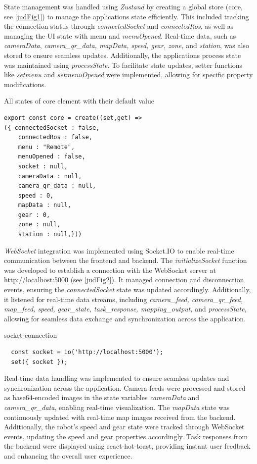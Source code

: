 \documentclass[../../main]{subfiles}
\begin{document}
State management was handled using \emph{Zustand} by creating a global
store (core, see \cref{judFig1}) to manage the application\textquotesingle s
state efficiently. This included tracking the connection status through
\emph{connectedSocket} and \emph{connectedRos}, as well as managing the
UI state with menu and \emph{menuOpened}. Real-time data, such as
\emph{cameraData}, \emph{camera\_qr\_data, mapData, speed, gear, zone,}
and \emph{station}, was also stored to ensure seamless updates.
Additionally, the application\textquotesingle s process state was
maintained using \emph{processState}. To facilitate state updates,
setter functions like \emph{setmenu} and \emph{setmenuOpened} were
implemented, allowing for specific property modifications.
\begin{codebox}[]{All states of core element with their default value}
\begin{verbatim}
export const core = create((set,get) => 
({ connectedSocket : false,
    connectedRos : false,
    menu : "Remote",
    menuOpened : false,
    socket : null,
    cameraData : null,
    camera_qr_data : null,
    speed : 0,
    mapData : null,
    gear : 0,
    zone : null,
    station : null,}))

\end{verbatim}
\end{codebox}
\emph{WebSocket} integration was implemented using Socket.IO to enable
real-time communication between the frontend and backend. The
\emph{initializeSocket} function was developed to establish a connection
with the WebSocket server at \url{http://localhost:5000} (see \cref{judFig2}).
It managed connection and disconnection events, ensuring the
\emph{connectedSocket} state was updated accordingly. Additionally, it
listened for real-time data streams, including \emph{camera\_feed,
camera\_qr\_feed, map\_feed, speed, gear\_state, task\_response,
mapping\_output,} and \emph{processState}, allowing for seamless data
exchange and synchronization across the application.
\begin{codebox}[]{socket connection}
  \begin{verbatim}
  const socket = io('http://localhost:5000');
  set({ socket });
\end{verbatim}
\end{codebox}


Real-time data handling was implemented to ensure seamless updates and
synchronization across the application. Camera feeds were processed and
stored as base64-encoded images in the state variables \emph{cameraData}
and \emph{camera\_qr\_data}, enabling real-time visualization. The
\emph{mapData} state was continuously updated with real-time map images
received from the backend. Additionally, the robot's speed and gear
state were tracked through WebSocket events, updating the speed and gear
properties accordingly. Task responses from the backend were displayed
using react-hot-toast, providing instant user feedback and enhancing the
overall user experience.
\end{document}
